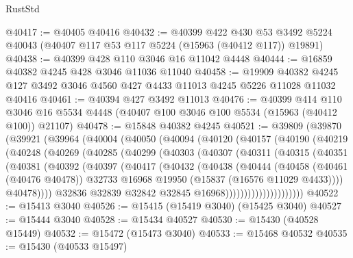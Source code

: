 \begin{lexlean}{RustStd}
\begin{coremodule}
@40417 := @40405 @40416
@40432 := @40399
    @422
    @430
    @53
    @3492
    @5224
    @40043
    (@40407 @117 @53 @117 @5224 (@15963 (@40412 @117)) @19891)
@40438 := @40399 @428 @110 @3046 @16 @11042 @4448
@40444 := @16859 @40382 @4245 @428 @3046 @11036 @11040
@40458 := @19909
    @40382
    @4245
    @127
    @3492
    @3046
    @4560
    @427
    @4433
    @11013
    @4245
    @5226
    @11028
    @11032
    @40416
@40461 := @40394 @427 @3492 @11013
@40476 := @40399
    @414
    @110
    @3046
    @16
    @5534
    @4448
    (@40407 @100 @3046 @100 @5534 (@15963 (@40412 @100)) @21107)
@40478 := @15848 @40382 @4245
@40521 := @39809
    (@39870
      (@39921
        (@39964
          (@40004
            (@40050
              (@40094
                (@40120
                  (@40157
                    (@40190
                      (@40219
                        (@40248
                          (@40269
                            (@40285
                              (@40299
                                (@40303
                                  (@40307
                                    (@40311
                                      (@40315
                                        (@40351
                                          (@40381
                                            (@40392
                                              (@40397
                                                (@40417
                                                  (@40432
                                                    (@40438
                                                      (@40444
                                                        (@40458
                                                          (@40461 (@40476 @40478))
                                                          @32733
                                                          @16968
                                                          @19950
                                                          (@15837 (@16576 @11029 @4433))))
                                                      @40478))))
                                              @32836
                                              @32839
                                              @32842
                                              @32845
                                              @16968)))))))))))))))))))))
@40522 := @15413 @3040
@40526 := @15415 (@15419 @3040) (@15425 @3040)
@40527 := @15444 @3040
@40528 := @15434 @40527
@40530 := @15430 (@40528 @15449)
@40532 := @15472 (@15473 @3040)
@40533 := @15468 @40532
@40535 := @15430 (@40533 @15497)

\end{coremodule}
\end{lexlean}
